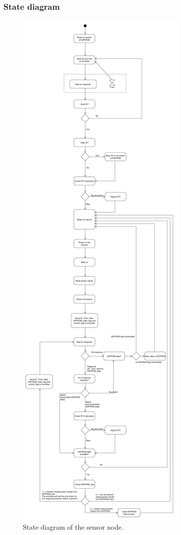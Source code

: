 \subsubsection{State diagram}

\begin{figure}[H]
	\begin{center}
	\includegraphics[scale=0.18]{images/SensorNode_0_4.pdf}
	\caption{State diagram of the sensor node.}
	\label{Setup_overview}
	\end{center}
\end{figure}
